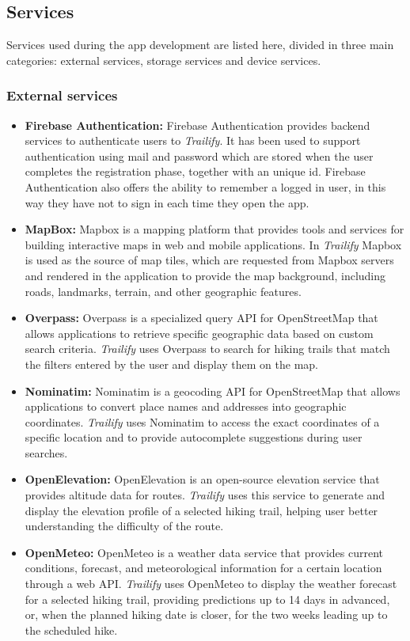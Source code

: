 \documentclass[12pt]{article}
\begin{document}
\subsection{Services}
    Services used during the app development are listed here, divided in three main categories: external services, storage services and device services.

    \subsubsection{External services}
    \begin{itemize}
        \item \textbf{Firebase Authentication:} Firebase Authentication provides backend services to authenticate users to \textit{Trailify}. It has been used to support authentication using mail and password which are stored when the user completes the registration phase, together with an unique id. Firebase Authentication also offers the ability to remember a logged in user, in this way they have not to sign in each time they open the app.

        \item \textbf{MapBox:} Mapbox is a mapping platform that provides tools and services for building interactive maps in web and mobile applications. In \textit{Trailify} Mapbox is used as the source of map tiles, which are requested from Mapbox servers and rendered in the application to provide the map background, including roads, landmarks, terrain, and other geographic features.

        \item \textbf{Overpass:} Overpass is a specialized query API for OpenStreetMap that allows applications to retrieve specific geographic data based on custom search criteria. \textit{Trailify} uses Overpass to search for hiking trails that match the filters entered by the user and display them on the map.

        \item \textbf{Nominatim:} Nominatim is a geocoding API for OpenStreetMap that allows applications to convert place names and addresses into geographic coordinates. \textit{Trailify} uses Nominatim to access the exact coordinates of a specific location and to provide autocomplete suggestions during user searches.

        \item \textbf{OpenElevation:} OpenElevation is an open-source elevation service that provides altitude data for routes. \textit{Trailify} uses this service to generate and display the elevation profile of a selected hiking trail, helping user better understanding the difficulty of the route.

        \item \textbf{OpenMeteo:} OpenMeteo is a weather data service that provides current conditions, forecast, and meteorological information for a certain location through a web API. \textit{Trailify} uses OpenMeteo to display the weather forecast for a selected hiking trail, providing predictions up to 14 days in advanced, or, when the planned hiking date is closer, for the two weeks leading up to the scheduled hike. 
    \end{itemize}
\end{document}
